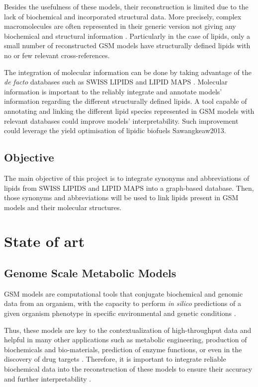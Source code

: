 \documentclass{llncs}
\begin{document}
Besides the usefulness of these models, their reconstruction is limited due to the lack of biochemical and incorporated structural data.
More precisely, complex macromolecules are often represented in their generic version not giving any biochemical and structural information \cite{Gu2019}.
Particularly in the case of lipids, only a small number of reconstructed GSM models have structurally defined lipids with no or few relevant cross-references. 

The integration of molecular information can be done by taking advantage of the  \emph{de facto} databases such as SWISS LIPIDS \cite{Aimo2015} and  LIPID MAPS \cite{Sud2007}.
Molecular information is important to the reliably integrate and annotate models' information regarding the different structurally defined lipids.
A tool capable of annotating and linking the different lipid species represented in GSM models with relevant databases could improve models' interpretability. Such improvement could leverage the yield optimisation of lipidic biofuels {Sawangkeaw2013}.




\subsection{Objective}

The main objective of this project is to integrate synonyms and abbreviations of lipids from SWISS LIPIDS and LIPID MAPS into a graph-based database. Then, those synonyms and abbreviations will be used to link lipids present in GSM models and their molecular structures.

\section{State of art}
\subsection{Genome Scale Metabolic Models}
GSM models are computational tools that conjugate biochemical and genomic data from an organism, with the capacity to perform \emph{in silico} predictions of a given organism phenotype in specific environmental and genetic conditions \cite{Rocha2007,Zhou2021}.

Thus, these models are key to the contextualization of high-throughput data and helpful in many other applications such as metabolic engineering, production of biochemicals and bio-materials, prediction of enzyme functions, or even in the discovery of drug targets \cite{Gu2019,Kim2017}.
Therefore, it is important to integrate reliable biochemical data into the reconstruction of these models to ensure their accuracy and further interpretability \cite{Moseley2021,Passi2021}. 
\end{document}
